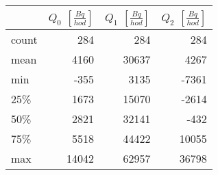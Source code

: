 \begin{tabular}{lrrr}
\toprule
{} &  $Q_0$ $\left[\si{\frac{Bq}{hod}}\right]$ &  $Q_1$ $\left[\si{\frac{Bq}{hod}}\right]$ &  $Q_2$ $\left[\si{\frac{Bq}{hod}}\right]$ \\
\midrule
count &                                       284 &                                       284 &                                       284 \\
mean  &                                      4160 &                                     30637 &                                      4267 \\
min   &                                      -355 &                                      3135 &                                     -7361 \\
25\%   &                                      1673 &                                     15070 &                                     -2614 \\
50\%   &                                      2821 &                                     32141 &                                      -432 \\
75\%   &                                      5518 &                                     44422 &                                     10055 \\
max   &                                     14042 &                                     62957 &                                     36798 \\
\bottomrule
\end{tabular}
